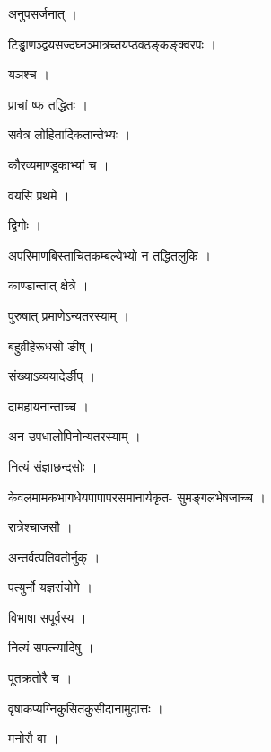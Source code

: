 \documentclass[10pt, openany]{book}
\begin{document}
\noindent अनुपसर्जनात् ।

\noindent टिड्ढाणञ्द्वयसज्दघ्नञ्मात्रच्तयप्ठक्ठङ्कङ्क्वरपः ।

\noindent यञश्च ।

\noindent प्राचां ष्फ तद्धितः ।

\noindent सर्वत्र लोहितादिकतान्तेभ्यः ।

\noindent कौरव्यमाण्डूकाभ्यां च ।

\noindent वयसि प्रथमे ।

\noindent द्विगोः ।

\noindent अपरिमाणबिस्ताचितकम्बल्येभ्यो न तद्धितलुकि ।

\noindent काण्डान्तात् क्षेत्रे ।

\noindent पुरुषात् प्रमाणेऽन्यतरस्याम् ।

\noindent बहुव्रीहेरूधसो ङीष्।

\noindent संख्याऽव्ययादेर्ङीप् ।

\noindent दामहायनान्ताच्च ।

\noindent अन उपधालोपिनोन्यतरस्याम् ।

\noindent नित्यं संज्ञाछन्दसोः ।

\noindent केवलमामकभागधेयपापापरसमानार्यकृत- सुमङ्गलभेषजाच्च ।

\noindent रात्रेश्चाजसौ ।

\noindent अन्तर्वत्पतिवतोर्नुक् ।

\noindent पत्युर्नो यज्ञसंयोगे ।

\noindent विभाषा सपूर्वस्य ।

\noindent नित्यं सपत्न्यादिषु ।

\noindent पूतक्रतोरै च ।

\noindent वृषाकप्यग्निकुसितकुसीदानामुदात्तः ।

\noindent मनोरौ वा ।
\end{document}
